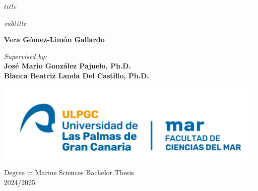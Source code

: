 %
%
%
% 


\begin{center}
    \Huge
    \textbf{$title$}
        
    \vspace{0.5cm}
    \LARGE
    $subtitle$
        
    \vspace{0.5cm}
    \textbf{Vera Gómez-Limón Gallardo}
        
    \vspace{0.5cm}
    \Large
    \textit{Supervised by:}\\
    \textbf{José Mario González Pajuelo, Ph.D.\\Blanca Beatriz Landa Del Castillo, Ph.D.}
        
    \vfill
    \includegraphics[width=\textwidth]{images/logo.png}
    Degree in Marine Sciences Bachelor Thesis\\2024/2025
        
\end{center}
	
	